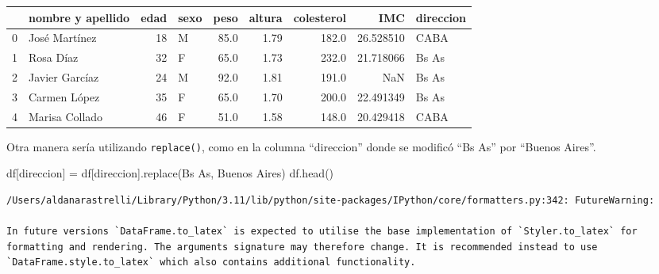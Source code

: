 \documentclass[
  letterpaper,
  DIV=11,
  numbers=noendperiod]{scrreprt}
\newenvironment{Shaded}{\begin{snugshade}}{\end{snugshade}}
\newcommand{\NormalTok}[1]{\textcolor[rgb]{0.00,0.23,0.31}{#1}}
\newcommand{\OperatorTok}[1]{\textcolor[rgb]{0.37,0.37,0.37}{#1}}
\newcommand{\StringTok}[1]{\textcolor[rgb]{0.13,0.47,0.30}{#1}}
\begin{document}
\begin{tabular}{llrlrrrrl}
\toprule
{} & nombre y apellido &  edad & sexo &  peso &  altura &  colesterol &        IMC & direccion \\
\midrule
0 &     José Martínez &    18 &    M &  85.0 &    1.79 &       182.0 &  26.528510 &      CABA \\
1 &         Rosa Díaz &    32 &    F &  65.0 &    1.73 &       232.0 &  21.718066 &     Bs As \\
2 &    Javier Garcíaz &    24 &    M &  92.0 &    1.81 &       191.0 &        NaN &     Bs As \\
3 &      Carmen López &    35 &    F &  65.0 &    1.70 &       200.0 &  22.491349 &     Bs As \\
4 &    Marisa Collado &    46 &    F &  51.0 &    1.58 &       148.0 &  20.429418 &      CABA \\
\bottomrule
\end{tabular}

Otra manera sería utilizando \texttt{replace()}, como en la columna
``direccion'' donde se modificó ``Bs As'' por ``Buenos Aires''.

\begin{Shaded}
\begin{Highlighting}[]
\NormalTok{df[}\StringTok{\textquotesingle{}direccion\textquotesingle{}}\NormalTok{] }\OperatorTok{=}\NormalTok{ df[}\StringTok{\textquotesingle{}direccion\textquotesingle{}}\NormalTok{].replace(}\StringTok{\textquotesingle{}Bs As\textquotesingle{}}\NormalTok{, }\StringTok{\textquotesingle{}Buenos Aires\textquotesingle{}}\NormalTok{)}
\NormalTok{df.head()}
\end{Highlighting}
\end{Shaded}

\begin{verbatim}
/Users/aldanarastrelli/Library/Python/3.11/lib/python/site-packages/IPython/core/formatters.py:342: FutureWarning:

In future versions `DataFrame.to_latex` is expected to utilise the base implementation of `Styler.to_latex` for formatting and rendering. The arguments signature may therefore change. It is recommended instead to use `DataFrame.style.to_latex` which also contains additional functionality.
\end{verbatim}
\end{document}
